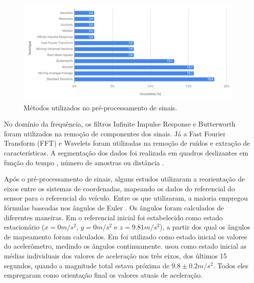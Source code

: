 \begin{figure}[h!]
  \centering
  \caption{Métodos utilizados no pré-processamento de sinais.}
   \label{fig:signal_preprocessing}
   \includegraphics[width=1\textwidth]{figuras/fig3_2.png}
\end{figure}

No domínio da frequência, os filtros Infinite Impulse Response \cite{Wu2018} e Butterworth \cite{Hou2017,Niskanen2015,Pitonak2016,Souza2018,Wu2013} foram utilizados na remoção de componentes dos sinais. Já a Fast Fourier Transform (FFT) \cite{Allouch2017,Douangphachanh2013,Douangphachanh2014} e Wavelets \cite{BelloSalau2018,Eftekhari2018,El-Wakeel2018,Gueta2017,Singh2017,Wang2018} foram utilizadas na remoção de ruídos e extração de características. A segmentação dos dados foi realizada em quadros deslizantes em função do tempo \cite{Wang2018}, número de amostras \cite{Singh2017} ou distância \cite{Li2018}.

Após o pré-processamento de sinais, alguns estudos utilizaram a reorientação de eixos entre os sistemas de coordenadas, mapeando os dados do referencial do sensor para o referencial do veículo. Entre os que utilizaram, a maioria empregou fórmulas baseadas nos ângulos de Euler \cite{Li2018, Orhan2013, Singh2017, Vittorio2014, Vlahogianni2017}. Os ângulos foram calculados de diferentes maneiras. Em \cite{Singh2017, Orhan2013, Vittorio2014} o referencial inicial foi estabelecido como estado estacionário ($x=0m/s^2$, $y=0m/s^2$ e $z=9.81m/s^2$), a partir dos qual os ângulos de mapeamento foram calculados. Em \cite{Li2018} foi utilizado como estado inicial os valores do acelerômetro, medindo os ângulos continuamente. \cite{Singh2018} usou como estado inicial as médias individuais dos valores de aceleração nos três eixos, dos últimos 15 segundos, quando a magnitude total estava próxima de $9.8 \pm 0.2 m/s^2$. Todos eles empregaram como orientação final os valores atuais de aceleração.

